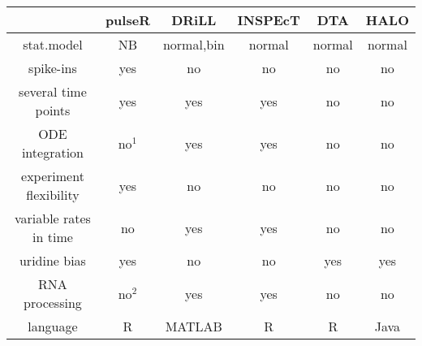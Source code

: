\begin{table}
 \begin{tabular}{|c|c|c|c|c|c|}\hline
                        &pulseR &DRiLL          &INSPEcT&DTA    &HALO       \\\hline
 stat.model             & NB    &normal,bin     &normal  & normal&normal     \\\hline                         
 spike-ins              & yes   & no            &  no    &  no   & no        \\\hline               
 several time points    & yes   & yes           &  yes   &  no   & no        \\\hline                    
 ODE integration        & no$^1$& yes           &  yes   &  no   & no        \\\hline 
 experiment flexibility & yes   & no            &  no    &  no   & no        \\\hline 
 variable rates in time & no    & yes           &  yes   &  no   & no        \\\hline 
            uridine bias& yes   & no            &  no    &  yes  & yes       \\\hline 
       RNA processing   & no$^2$& yes           &  yes   &  no   & no        \\\hline 
  language              & R     &MATLAB         &  R     &  R    & Java      \\\hline 
 \end{tabular}

\end{table}
